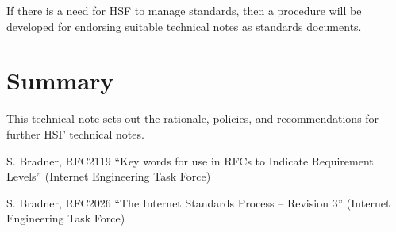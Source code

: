 \documentclass[12pt,a4paper]{article}
\begin{document}
If there is a need for HSF
to manage standards, then a procedure will be developed for endorsing
suitable technical notes as standards documents.

\section{Summary}
\label{sec:Summary}

This technical note sets out the rationale, policies, and recommendations
for further HSF technical notes.



\begin{thebibliography}{9}

 S. Bradner, RFC2119 ``Key words for use in RFCs to Indicate Requirement Levels'' (Internet Engineering Task Force)

 S. Bradner, RFC2026 ``The Internet Standards Process -- Revision 3'' (Internet Engineering Task Force)

\end{thebibliography}


\end{document}
